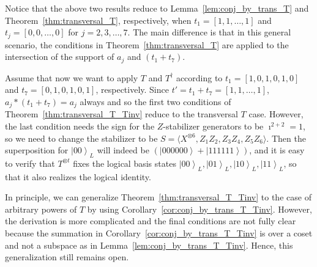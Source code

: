 \documentclass[twoside,romanappendices]{IEEEtran}
\newenvironment{example*}
  {\addtocounter{example}{-1}\example}
  {\endexample}
\newcommand{\ket}[1]{\left\lvert #1 \right\rangle}
\begin{document}




Notice that the above two results reduce to Lemma~\ref{lem:conj_by_trans_T} and Theorem~\ref{thm:transversal_T}, respectively, when $t_1 = [1,1,\ldots,1]$ and $t_j = [0,0,\ldots,0]$ for $j = 2,3,\ldots,7$.
The main difference is that in this general scenario, the conditions in Theorem~\ref{thm:transversal_T} are applied to the intersection of the support of $a_j$ and $(t_1 + t_7)$.


\begin{example*}[contd.]
\normalfont
Assume that now we want to apply $T$ and $T^{\dagger}$ according to $t_1 = [1,0,1,0,1,0]$ and $t_7 = [0,1,0,1,0,1]$, respectively.
Since $t' = t_1 + t_7 = [1,1,\ldots,1]$, $a_j \ast (t_1 + t_7) = a_j$ always and so the first two conditions of Theorem~\ref{thm:transversal_T_Tinv} reduce to the transversal $T$ case.
However, the last condition needs the sign for the $Z$-stabilizer generators to be $\imath^{2 + 2} = 1$, so we need to change the stabilizer to be $S = \langle X^{\otimes 6}, Z_1 Z_2, Z_3 Z_4, Z_5 Z_6 \rangle$.
Then the superposition for $\ket{00}_L$ will indeed be $(\ket{000000} + \ket{111111})$, and it is easy to verify that $T^{\otimes t}$ fixes the logical basis states $\ket{00}_L, \ket{01}_L, \ket{10}_L, \ket{11}_L$, so that it also realizes the logical identity.
\end{example*}


In principle, we can generalize Theorem~\ref{thm:transversal_T_Tinv} to the case of arbitrary powers of $T$ by using Corollary~\ref{cor:conj_by_trans_T_Tinv}.
However, the derivation is more complicated and the final conditions are not fully clear because the summation in Corollary~\ref{cor:conj_by_trans_T_Tinv} is over a coset and not a subspace as in Lemma~\ref{lem:conj_by_trans_T_Tinv}.
Hence, this generalization still remains open.
\end{document}
